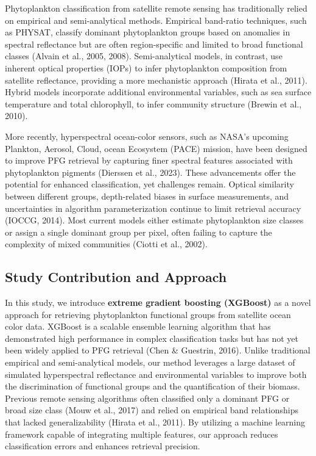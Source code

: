 \documentclass[
]{agujournal2019}
\begin{document}
Phytoplankton classification from satellite remote sensing has
traditionally relied on empirical and semi-analytical methods. Empirical
band-ratio techniques, such as PHYSAT, classify dominant phytoplankton
groups based on anomalies in spectral reflectance but are often
region-specific and limited to broad functional classes (Alvain et al.,
2005, 2008). Semi-analytical models, in contrast, use inherent optical
properties (IOPs) to infer phytoplankton composition from satellite
reflectance, providing a more mechanistic approach (Hirata et al.,
2011). Hybrid models incorporate additional environmental variables,
such as sea surface temperature and total chlorophyll, to infer
community structure (Brewin et al., 2010).

More recently, hyperspectral ocean-color sensors, such as NASA's
upcoming Plankton, Aerosol, Cloud, ocean Ecosystem (PACE) mission, have
been designed to improve PFG retrieval by capturing finer spectral
features associated with phytoplankton pigments (Dierssen et al., 2023).
These advancements offer the potential for enhanced classification, yet
challenges remain. Optical similarity between different groups,
depth-related biases in surface measurements, and uncertainties in
algorithm parameterization continue to limit retrieval accuracy (IOCCG,
2014). Most current models either estimate phytoplankton size classes or
assign a single dominant group per pixel, often failing to capture the
complexity of mixed communities (Ciotti et al., 2002).

\subsection{Study Contribution and
Approach}\label{study-contribution-and-approach}

In this study, we introduce \textbf{extreme gradient boosting (XGBoost)}
as a novel approach for retrieving phytoplankton functional groups from
satellite ocean color data. XGBoost is a scalable ensemble learning
algorithm that has demonstrated high performance in complex
classification tasks but has not yet been widely applied to PFG
retrieval (Chen \& Guestrin, 2016). Unlike traditional empirical and
semi-analytical models, our method leverages a large dataset of
simulated hyperspectral reflectance and environmental variables to
improve both the discrimination of functional groups and the
quantification of their biomass. Previous remote sensing algorithms
often classified only a dominant PFG or broad size class (Mouw et al.,
2017) and relied on empirical band relationships that lacked
generalizability (Hirata et al., 2011). By utilizing a machine learning
framework capable of integrating multiple features, our approach reduces
classification errors and enhances retrieval precision.
\end{document}

